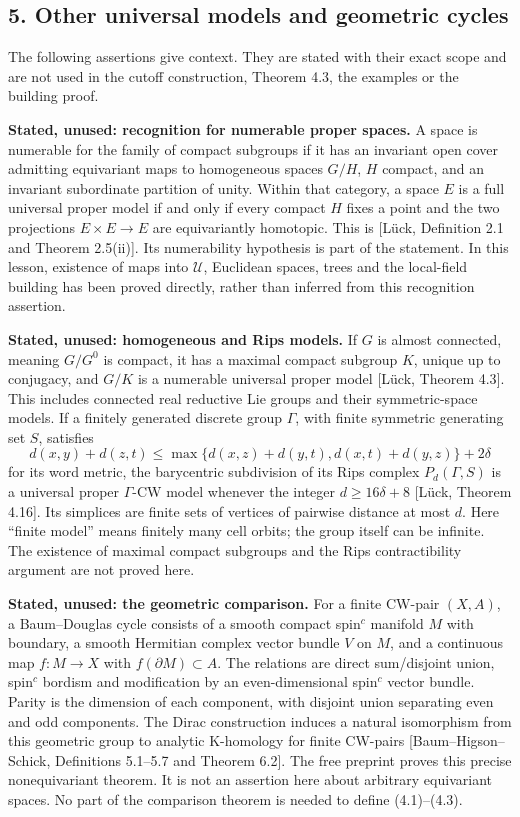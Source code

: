 \documentclass[
  11pt,
]{article}
\begin{document}
\subsection{5. Other universal models and geometric
cycles}\label{other-universal-models-and-geometric-cycles}

The following assertions give context. They are stated with their exact
scope and are not used in the cutoff construction, Theorem 4.3, the
examples or the building proof.

\textbf{Stated, unused: recognition for numerable proper spaces.} A
space is numerable for the family of compact subgroups if it has an
invariant open cover admitting equivariant maps to homogeneous spaces
\(G/H\), \(H\) compact, and an invariant subordinate partition of unity.
Within that category, a space \(E\) is a full universal proper model if
and only if every compact \(H\) fixes a point and the two projections
\(E\times E\to E\) are equivariantly homotopic. This is {[}Lück,
Definition 2.1 and Theorem 2.5(ii){]}. Its numerability hypothesis is
part of the statement. In this lesson, existence of maps into
\(\mathcal U\), Euclidean spaces, trees and the local-field building has
been proved directly, rather than inferred from this recognition
assertion.

\textbf{Stated, unused: homogeneous and Rips models.} If \(G\) is almost
connected, meaning \(G/G^0\) is compact, it has a maximal compact
subgroup \(K\), unique up to conjugacy, and \(G/K\) is a numerable
universal proper model {[}Lück, Theorem 4.3{]}. This includes connected
real reductive Lie groups and their symmetric-space models. If a
finitely generated discrete group \(\Gamma\), with finite symmetric
generating set \(S\), satisfies \[
 d(x,y)+d(z,t)\le\max\{d(x,z)+d(y,t),d(x,t)+d(y,z)\}+2\delta
\] for its word metric, the barycentric subdivision of its Rips complex
\(P_d(\Gamma,S)\) is a universal proper \(\Gamma\)-CW model whenever the
integer \(d\ge16\delta+8\) {[}Lück, Theorem 4.16{]}. Its simplices are
finite sets of vertices of pairwise distance at most \(d\). Here
``finite model'' means finitely many cell orbits; the group itself can
be infinite. The existence of maximal compact subgroups and the Rips
contractibility argument are not proved here.

\textbf{Stated, unused: the geometric comparison.} For a finite CW-pair
\((X,A)\), a Baum--Douglas cycle consists of a smooth compact
spin\({}^c\) manifold \(M\) with boundary, a smooth Hermitian complex
vector bundle \(V\) on \(M\), and a continuous map \(f:M\to X\) with
\(f(\partial M)\subset A\). The relations are direct sum/disjoint union,
spin\({}^c\) bordism and modification by an even-dimensional
spin\({}^c\) vector bundle. Parity is the dimension of each component,
with disjoint union separating even and odd components. The Dirac
construction induces a natural isomorphism from this geometric group to
analytic K-homology for finite CW-pairs {[}Baum--Higson--Schick,
Definitions 5.1--5.7 and Theorem 6.2{]}. The free preprint proves this
precise nonequivariant theorem. It is not an assertion here about
arbitrary equivariant spaces. No part of the comparison theorem is
needed to define (4.1)--(4.3).
\end{document}
